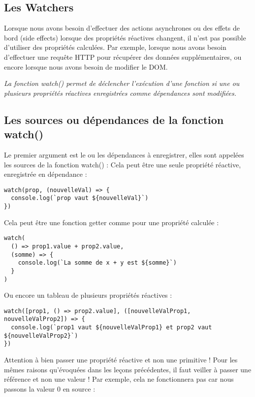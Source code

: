 \subsection{Les {\color{monOrange}Watchers}}
Lorsque nous avons besoin d'effectuer des actions asynchrones ou des effets de bord ({\color{monOrange}side effects}) lorsque des propriétés réactives changent, il n'est pas possible d'utiliser des propriétés calculées. Par exemple, lorsque nous avons besoin d'effectuer une requête HTTP pour récupérer des données supplémentaires, ou encore lorsque nous avons besoin de modifier le DOM.

{\em La fonction {\color{monOrange}watch()} permet de déclencher l'exécution d'une fonction si une ou plusieurs propriétés réactives enregistrées comme dépendances sont modifiées.}

\subsection{Les sources ou dépendances de la fonction {\color{monOrange}watch()}}
Le premier argument est le ou les dépendances à enregistrer, elles sont appelées les sources de la fonction {\color{monOrange}watch()} : Cela peut être une seule propriété réactive, enregistrée en dépendance :
\begin{verbatim}
watch(prop, (nouvelleVal) => {
  console.log(`prop vaut ${nouvelleVal}`)
})
\end{verbatim}
Cela peut être une fonction getter comme pour une propriété calculée :
\begin{verbatim}
watch(
  () => prop1.value + prop2.value,
  (somme) => {
    console.log(`La somme de x + y est ${somme}`)
  }
)
\end{verbatim}
Ou encore un tableau de plusieurs propriétés réactives :
\begin{verbatim}
watch([prop1, () => prop2.value], ([nouvelleValProp1, nouvelleValProp2]) => {
  console.log(`prop1 vaut ${nouvelleValProp1} et prop2 vaut ${nouvelleValProp2}`)
})
\end{verbatim}
Attention à bien passer une propriété réactive et non une primitive ! Pour les mêmes raisons qu'évoquées dans les leçons précédentes, il faut veiller à passer une référence et non une valeur ! Par exemple, cela ne fonctionnera pas car nous passons la valeur 0 en source :
